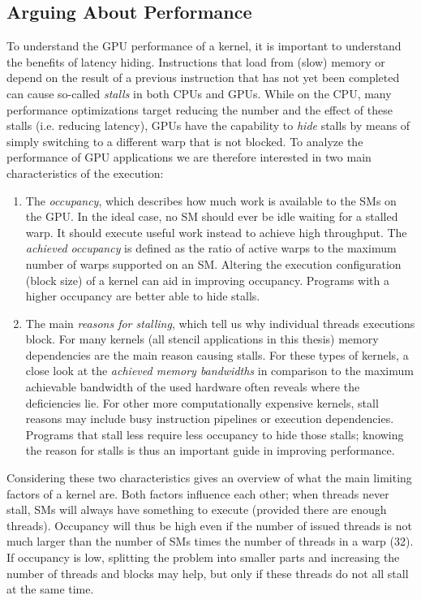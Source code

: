 \subsection{Arguing About Performance}

To understand the GPU performance of a kernel, it is important to understand the benefits of latency hiding. Instructions that load from (slow) memory or depend on the result of a previous instruction that has not yet been completed can cause so-called \emph{stalls} in both CPUs and GPUs. While on the CPU, many performance optimizations target reducing the number and the effect of these stalls (i.e. reducing latency), GPUs have the capability to \emph{hide} stalls by means of simply switching to a different warp that is not blocked. To analyze the performance of GPU applications we are therefore interested in two main characteristics of the execution:

\begin{enumerate}
    \item The \emph{occupancy}, which describes how much work is available to the SMs on the GPU. In the ideal case, no SM should ever be idle waiting for a stalled warp. It should execute useful work instead to achieve high throughput. The \emph{achieved occupancy} is defined as the ratio of active warps to the maximum number of warps supported on an SM. Altering the execution configuration (block size) of a kernel can aid in improving occupancy. Programs with a higher occupancy are better able to hide stalls.
    \item The main \emph{reasons for stalling}, which tell us why individual threads executions block. For many kernels (all stencil applications in this thesis) memory dependencies are the main reason causing stalls. For these types of kernels, a close look at the \emph{achieved memory bandwidths} in comparison to the maximum achievable bandwidth of the used hardware often reveals where the deficiencies lie. For other more computationally expensive kernels, stall reasons may include busy instruction pipelines or execution dependencies. Programs that stall less require less occupancy to hide those stalls; knowing the reason for stalls is thus an important guide in improving performance.
\end{enumerate}

Considering these two characteristics gives an overview of what the main limiting factors of a kernel are. Both factors influence each other; when threads never stall, SMs will always have something to execute (provided there are enough threads). Occupancy will thus be high even if the number of issued threads is not much larger than the number of SMs times the number of threads in a warp (32). If occupancy is low, splitting the problem into smaller parts and increasing the number of threads and blocks may help, but only if these threads do not all stall at the same time.

